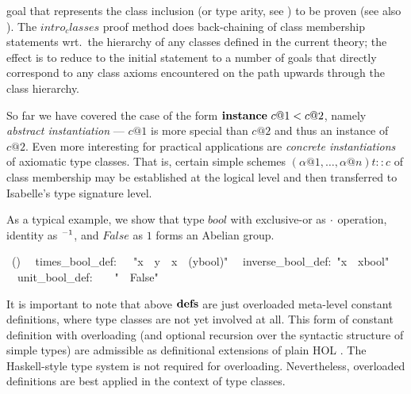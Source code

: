 \begin{isabelle}
\begin{isamarkuptext}
 goal that represents the class inclusion (or type arity, see
 ) to be proven
 (see also \cite{isabelle-isar-ref}).  The $intro_classes$ proof
 method does back-chaining of class membership statements wrt.\ the
 hierarchy of any classes defined in the current theory; the effect is
 to reduce to the initial statement to a number of goals that directly
 correspond to any class axioms encountered on the path upwards
 through the class hierarchy.%
\end{isamarkuptext}%
%
%
\begin{isamarkuptext}%
So far we have covered the case of the form
 $\emph{\bf instance}~c@1 < c@2$, namely \emph{abstract
 instantiation} --- $c@1$ is more special than $c@2$ and thus an
 instance of $c@2$.  Even more interesting for practical applications
 are \emph{concrete instantiations} of axiomatic type classes.  That
 is, certain simple schemes $(\alpha@1, \ldots, \alpha@n)t :: c$ of
 class membership may be established at the logical level and then
 transferred to Isabelle's type signature level.

 \medskip As a typical example, we show that type $bool$ with
 exclusive-or as $\cdot$ operation, identity as $\emph{${}^{-1}$}$, and
 $False$ as $1$ forms an Abelian group.%
\end{isamarkuptext}%
\ ()\isanewline
\ \ times\_bool\_def:\ \ \ {"}x\ {\isasymOtimes}\ y\ {\isasymequiv}\ x\ {\isasymnoteq}\ (y{\isasymColon}bool){"}\isanewline
\ \ inverse\_bool\_def:\ {"}x{\isasyminv}\ {\isasymequiv}\ x{\isasymColon}bool{"}\isanewline
\ \ unit\_bool\_def:\ \ \ \ {"}{\isasymunit}\ {\isasymequiv}\ False{"}%
\begin{isamarkuptext}%
\medskip It is important to note that above ${\mathord{\mathbf{defs}}}$ are just
 overloaded meta-level constant definitions, where type classes are
 not yet involved at all.  This form of constant definition with
 overloading (and optional recursion over the syntactic structure of
 simple types) are admissible as definitional extensions of plain HOL
 \cite{Wenzel:1997:TPHOL}.  The Haskell-style type system is not
 required for overloading.  Nevertheless, overloaded definitions are
 best applied in the context of type classes.


\end{isamarkuptext}
\end{isabelle}
